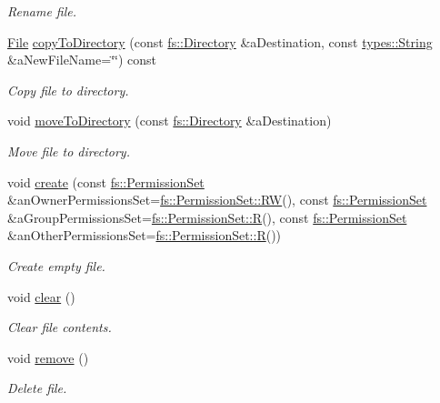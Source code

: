 \begin{DoxyCompactItemize}
\begin{DoxyCompactList}\small\item\em Rename file. \end{DoxyCompactList}\item 
\hyperlink{classlibrary_1_1core_1_1fs_1_1_file}{File} \hyperlink{classlibrary_1_1core_1_1fs_1_1_file_a97b8b2deee991e5eefb78e811806788d}{copy\+To\+Directory} (const \hyperlink{classlibrary_1_1core_1_1fs_1_1_directory}{fs\+::\+Directory} \&a\+Destination, const \hyperlink{classlibrary_1_1core_1_1types_1_1_string}{types\+::\+String} \&a\+New\+File\+Name=\char`\"{}\char`\"{}) const
\begin{DoxyCompactList}\small\item\em Copy file to directory. \end{DoxyCompactList}\item 
void \hyperlink{classlibrary_1_1core_1_1fs_1_1_file_ac81efdfeb17ea50abe23d96f69bc15ae}{move\+To\+Directory} (const \hyperlink{classlibrary_1_1core_1_1fs_1_1_directory}{fs\+::\+Directory} \&a\+Destination)
\begin{DoxyCompactList}\small\item\em Move file to directory. \end{DoxyCompactList}\item 
void \hyperlink{classlibrary_1_1core_1_1fs_1_1_file_aa83b1f11be8c9106e780266dc097d03c}{create} (const \hyperlink{classlibrary_1_1core_1_1fs_1_1_permission_set}{fs\+::\+Permission\+Set} \&an\+Owner\+Permissions\+Set=\hyperlink{classlibrary_1_1core_1_1fs_1_1_permission_set_a9722204cdc11a0171e1a115d449a134b}{fs\+::\+Permission\+Set\+::\+RW}(), const \hyperlink{classlibrary_1_1core_1_1fs_1_1_permission_set}{fs\+::\+Permission\+Set} \&a\+Group\+Permissions\+Set=\hyperlink{classlibrary_1_1core_1_1fs_1_1_permission_set_a48d447273c118d6a7c81aebb505189c6}{fs\+::\+Permission\+Set\+::R}(), const \hyperlink{classlibrary_1_1core_1_1fs_1_1_permission_set}{fs\+::\+Permission\+Set} \&an\+Other\+Permissions\+Set=\hyperlink{classlibrary_1_1core_1_1fs_1_1_permission_set_a48d447273c118d6a7c81aebb505189c6}{fs\+::\+Permission\+Set\+::R}())
\begin{DoxyCompactList}\small\item\em Create empty file. \end{DoxyCompactList}\item 
void \hyperlink{classlibrary_1_1core_1_1fs_1_1_file_a0b95ab08dd8df2cc28b2e42a72ae0b9a}{clear} ()
\begin{DoxyCompactList}\small\item\em Clear file contents. \end{DoxyCompactList}\item 
void \hyperlink{classlibrary_1_1core_1_1fs_1_1_file_a438408d402b994d76d4de3829ec67dbc}{remove} ()
\begin{DoxyCompactList}\small\item\em Delete file. \end{DoxyCompactList}\end{DoxyCompactItemize}

